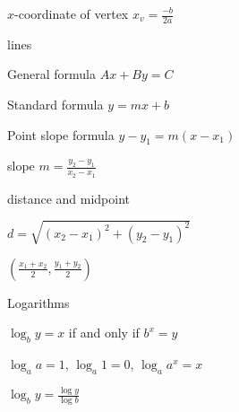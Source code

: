 \documentclass[12pt]{article}
\newenvironment{problem}[2][Problem]{\begin{trivlist}
\item[\hskip \labelsep {\bfseries #1}\hskip \labelsep {\bfseries #2.}]}{\end{trivlist}}
\newenvironment{sol}
    {\emph{Solution:}
    }
    {
    \qed
    }
\begin{document}
\begin{multicols}{2}
  $x$-coordinate of vertex $x_v=\displaystyle\frac{-b}{2a}$

  \vspace{.25in}
  {\large{lines}}

  \begin{description}
  \item General formula $Ax+By=C$
  \item Standard formula $y = mx+b$
  \item Point slope formula $y-y_1 = m(x-x_1)$
  \item slope $m=\displaystyle\frac{y_2-y_1}{x_2-x_1}$
  \end{description}

  \vspace{.25in}
  {\large{distance and midpoint}}

  \begin{description}
  \item $d=\sqrt{(x_2-x_1)^2+(y_2-y_1)^2}$
    \item $\displaystyle\left(\frac{x_1+x_2}{2},\frac{y_1+y_2}{2}\right)$
  \end{description}

  \vspace{.25in}
  {\large{Logarithms}}

  \begin{description}
  \item $\log_b y = x$ if and only if $b^x=y$
  \item $\log_a a=1$, $\log_a 1 = 0$, $\log_a a^x=x$
  \item $ \displaystyle \log_b y = \frac{\log y}{\log b}$
  \end{description}
  

  
  
  
  
  
\end{multicols}



\end{document}
